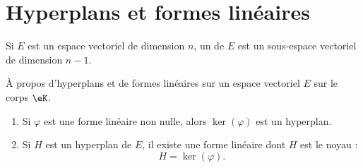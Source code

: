 
\section{Hyperplans et formes linéaires}

\begin{definition}      \label{DEFooEWDTooQbUQws}
    Si \( E\) est un espace vectoriel de dimension \( n\), un  de \( E\) est un sous-espace vectoriel de dimension \( n-1\).
\end{definition}

\begin{proposition}      \label{PROPooVYJUooAWDQrZ}
    À propos d'hyperplans et de formes linéaires sur un espace vectoriel \( E\) sur le corps \( \eK\).
    \begin{enumerate}
        \item
            Si \( \varphi\) est une forme linéaire non nulle, alors \( \ker(\varphi)\) est un hyperplan.
        \item
            Si \( H\) est un hyperplan de \( E\), il existe une forme linéaire dont \( H\) est le noyau :
            \begin{equation}
                H=\ker(\varphi).
            \end{equation}
    \end{enumerate}
\end{proposition}

